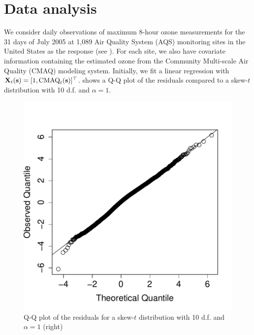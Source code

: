 \documentclass[useAMS,usenatbib,referee]{biom}
\begin{document}
\section{Data analysis}\label{sts:analysis}
We consider daily observations of maximum 8-hour ozone measurements for the 31 days of July 2005 at 1,089 Air Quality System (AQS) monitoring sites in the United States as the response (see ).
For each site, we also have covariate information containing the estimated ozone from the Community Multi-scale Air Quality (CMAQ) modeling system.
Initially, we fit a linear regression with $\mbox{\bf X}_t(\mbox{\bf s}) = [1, \text{CMAQ}_t(\mbox{\bf s})]^\top$. %
 shows a Q-Q plot of the residuals compared to a skew-$t$ distribution with 10 d.f. and $\alpha = 1$.
\begin{figure}
  \centering
  \includegraphics[width=0.5\linewidth]{plots/qq-res.pdf}
  \caption{Q-Q plot of the residuals for a skew-$t$ distribution with 10 d.f. and $\alpha = 1$ (right)}
  \label{stfig:ozone-qq}
\end{figure}
\end{document}
